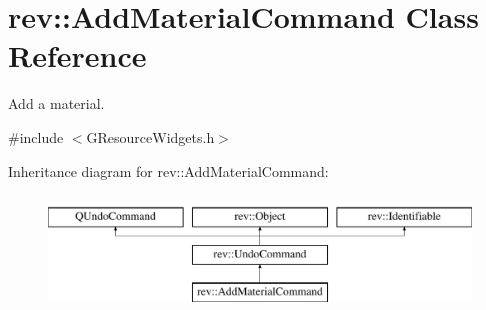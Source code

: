 \hypertarget{classrev_1_1_add_material_command}{}\section{rev\+::Add\+Material\+Command Class Reference}
\label{classrev_1_1_add_material_command}


Add a material.  




{\ttfamily \#include $<$G\+Resource\+Widgets.\+h$>$}

Inheritance diagram for rev\+::Add\+Material\+Command\+:\begin{figure}[H]
\begin{center}
\leavevmode
\includegraphics[height=3.000000cm]{classrev_1_1_add_material_command}
\end{center}
\end{figure}
